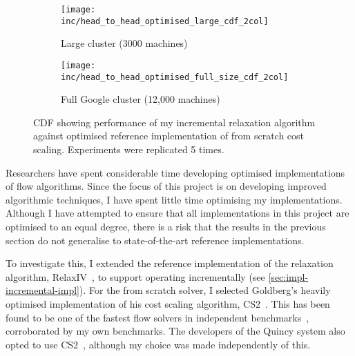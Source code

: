 \begin{figure}
    \begin{widepage}
        \begin{subfigure}[c]{0.5\textwidth}
            \texttt{[image: inc/head\_to\_head\_optimised\_large\_cdf\_2col]}
            \caption{Large cluster (3000 machines)}
            \label{fig:inc-head-to-head-optimised:large}
        \end{subfigure}
        \begin{subfigure}[c]{0.5\textwidth}
            \texttt{[image: inc/head\_to\_head\_optimised\_full\_size\_cdf\_2col]}
            \caption{Full Google cluster (12,000 machines)}
            \label{fig:inc-head-to-head-optimised:full-size}
        \end{subfigure}
    \end{widepage}
    \caption[Performance of my incremental algorithm against optimised reference implementation]{CDF showing performance of my incremental relaxation algorithm against optimised reference implementation of from scratch cost scaling. Experiments were replicated 5 times.}
    \label{fig:inc-head-to-head-optimised}
\end{figure}

Researchers have spent considerable time developing optimised implementations of flow algorithms. Since the focus of this project is on developing improved algorithmic techniques, I have spent little time optimising my implementations. Although I have attempted to ensure that all implementations in this project are optimised to an equal degree, there is a risk that the results in the previous section do not generalise to state-of-the-art reference implementations. 

To investigate this, I extended the reference implementation of the relaxation algorithm, RelaxIV~\cite{RelaxIV:2011}, to support operating incrementally (see \cref{sec:impl-incremental-impl}). For the from scratch solver, I selected Goldberg's heavily optimised implementation of his cost scaling algorithm, CS2~\cite{CS2:2009}. This has been found to be one of the fastest flow solvers in independent benchmarks~\cite{KiralyKovacs:2012}, corroborated by my own benchmarks. The developers of the Quincy system also opted to use CS2~\cite{Isard:2009}, although my choice was made independently of this.


